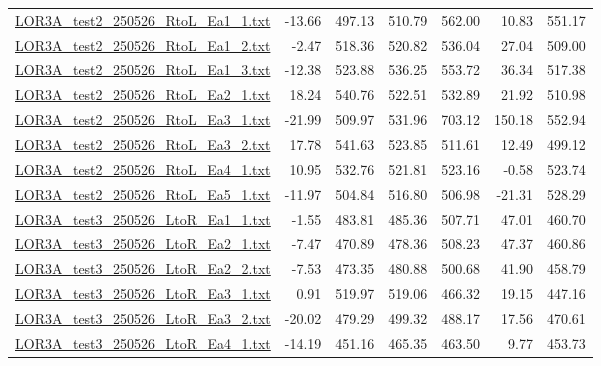\documentclass[platex,dvipdfmx,10pt,twoside,a4paper,jis2004]{jsarticle}
\begin{document}
\begin{table}[H]
{\begin{tabular}{lD{.}{.}{4.2}D{.}{.}{4.2}D{.}{.}{4.2}D{.}{.}{4.2}D{.}{.}{4.2}D{.}{.}{4.2}}
            \hyperref[fig:LOR3Atest2250526RtoLEa11]{LOR3A\_test2\_250526\_RtoL\_Ea1\_1.txt} & -13.66 & 497.13 & 510.79 & 562.00 & 10.83 & 551.17 \\
            \hyperref[fig:LOR3Atest2250526RtoLEa12]{LOR3A\_test2\_250526\_RtoL\_Ea1\_2.txt} & -2.47 & 518.36 & 520.82 & 536.04 & 27.04 & 509.00 \\
            \hyperref[fig:LOR3Atest2250526RtoLEa13]{LOR3A\_test2\_250526\_RtoL\_Ea1\_3.txt} & -12.38 & 523.88 & 536.25 & 553.72 & 36.34 & 517.38 \\
            \hyperref[fig:LOR3Atest2250526RtoLEa21]{LOR3A\_test2\_250526\_RtoL\_Ea2\_1.txt} & 18.24 & 540.76 & 522.51 & 532.89 & 21.92 & 510.98 \\
            \hyperref[fig:LOR3Atest2250526RtoLEa31]{LOR3A\_test2\_250526\_RtoL\_Ea3\_1.txt} & -21.99 & 509.97 & 531.96 & 703.12 & 150.18 & 552.94 \\
            \hyperref[fig:LOR3Atest2250526RtoLEa32]{LOR3A\_test2\_250526\_RtoL\_Ea3\_2.txt} & 17.78 & 541.63 & 523.85 & 511.61 & 12.49 & 499.12 \\
            \hyperref[fig:LOR3Atest2250526RtoLEa41]{LOR3A\_test2\_250526\_RtoL\_Ea4\_1.txt} & 10.95 & 532.76 & 521.81 & 523.16 & -0.58 & 523.74 \\
            \hyperref[fig:LOR3Atest2250526RtoLEa51]{LOR3A\_test2\_250526\_RtoL\_Ea5\_1.txt} & -11.97 & 504.84 & 516.80 & 506.98 & -21.31 & 528.29 \\
            \hyperref[fig:LOR3Atest3250526LtoREa11]{LOR3A\_test3\_250526\_LtoR\_Ea1\_1.txt} & -1.55 & 483.81 & 485.36 & 507.71 & 47.01 & 460.70 \\
            \hyperref[fig:LOR3Atest3250526LtoREa21]{LOR3A\_test3\_250526\_LtoR\_Ea2\_1.txt} & -7.47 & 470.89 & 478.36 & 508.23 & 47.37 & 460.86 \\
            \hyperref[fig:LOR3Atest3250526LtoREa22]{LOR3A\_test3\_250526\_LtoR\_Ea2\_2.txt} & -7.53 & 473.35 & 480.88 & 500.68 & 41.90 & 458.79 \\
            \hyperref[fig:LOR3Atest3250526LtoREa31]{LOR3A\_test3\_250526\_LtoR\_Ea3\_1.txt} & 0.91 & 519.97 & 519.06 & 466.32 & 19.15 & 447.16 \\
            \hyperref[fig:LOR3Atest3250526LtoREa32]{LOR3A\_test3\_250526\_LtoR\_Ea3\_2.txt} & -20.02 & 479.29 & 499.32 & 488.17 & 17.56 & 470.61 \\
            \hyperref[fig:LOR3Atest3250526LtoREa41]{LOR3A\_test3\_250526\_LtoR\_Ea4\_1.txt} & -14.19 & 451.16 & 465.35 & 463.50 & 9.77 & 453.73 \\

\end{tabular}}
\end{table}
\end{document}
